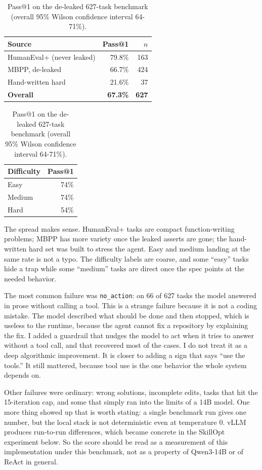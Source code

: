 \documentclass[11pt]{article}
\newcommand{\code}[1]{\texttt{\small #1}}
\begin{document}
\begin{table}[h]
\centering
\begin{tabular}{lrr}
\toprule
Source & Pass@1 & $n$ \\
\midrule
HumanEval+ (never leaked)   & 79.8\% & 163 \\
MBPP, de-leaked             & 66.7\% & 424 \\
Hand-written hard           & 21.6\% & 37 \\
\midrule
\textbf{Overall}            & \textbf{67.3\%} & \textbf{627} \\
\bottomrule
\end{tabular}
\qquad
\begin{tabular}{lr}
\toprule
Difficulty & Pass@1 \\
\midrule
Easy   & 74\% \\
Medium & 74\% \\
Hard   & 54\% \\
\bottomrule
\end{tabular}
\caption{Pass@1 on the de-leaked 627-task benchmark (overall 95\% Wilson confidence interval 64-71\%).}
\label{tab:results}
\end{table}

The spread makes sense. HumanEval+ tasks are compact function-writing problems; MBPP has more variety once
the leaked asserts are gone; the hand-written hard set was built to stress the agent. Easy and medium
landing at the same rate is not a typo. The difficulty labels are coarse, and some ``easy'' tasks hide a
trap while some ``medium'' tasks are direct once the spec points at the needed behavior.

The most common failure was \code{no\_action}: on 66 of 627 tasks the model answered in prose without
calling a tool. This is a strange failure because it is not a coding mistake. The model described what
should be done and then stopped, which is useless to the runtime, because the agent cannot fix a
repository by explaining the fix. I added a guardrail that nudges the model to act when it tries to answer
without a tool call, and that recovered most of the cases. I do not treat it as a deep algorithmic
improvement. It is closer to adding a sign that says ``use the tools.'' It still mattered, because tool use
is the one behavior the whole system depends on.

Other failures were ordinary: wrong solutions, incomplete edits, tasks that hit the 15-iteration cap, and
some that simply ran into the limits of a 14B model. One more thing showed up that is worth stating: a
single benchmark run gives one number, but the local stack is not deterministic even at temperature 0.
vLLM produces run-to-run differences, which became concrete in the SkillOpt experiment below. So the
score should be read as a measurement of this implementation under this benchmark, not as a property of
Qwen3-14B or of ReAct in general.
\end{document}
